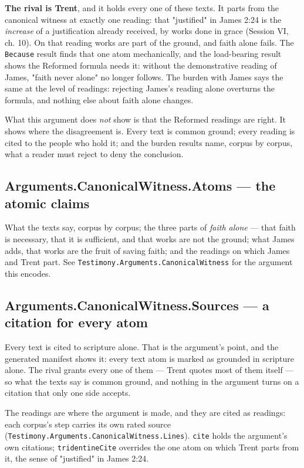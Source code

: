 \documentclass[11pt]{article}
\begin{document}
\textbf{The rival is Trent}, and it holds every one of these texts. It parts from the canonical witness at exactly one reading: that "justified" in James 2:24 is the \emph{increase} of a justification already received, by works done in grace (Session VI, ch. 10). On that reading works are part of the ground, and faith alone fails. The \texttt{Because} result finds that one atom mechanically, and the load-bearing result shows the Reformed formula needs it: without the demonstrative reading of James, "faith never alone" no longer follows. The burden with James says the same at the level of readings: rejecting James's reading alone overturns the formula, and nothing else about faith alone changes.

What this argument does \emph{not} show is that the Reformed readings are right. It shows where the disagreement is. Every text is common ground; every reading is cited to the people who hold it; and the burden results name, corpus by corpus, what a reader must reject to deny the conclusion.

\subsection*{Arguments.CanonicalWitness.Atoms — the atomic claims}
What the texts say, corpus by corpus; the three parts of \emph{faith alone} — that faith is necessary, that it is sufficient, and that works are not the ground; what James adds, that works are the fruit of saving faith; and the readings on which James and Trent part. See \texttt{Testimony.Arguments.Canonical\allowbreak{}Witness} for the argument this encodes.

\subsection*{Arguments.CanonicalWitness.Sources — a citation for every atom}
Every text is cited to scripture alone. That is the argument's point, and the generated manifest shows it: every text atom is marked as grounded in scripture alone. The rival grants every one of them — Trent quotes most of them itself — so what the texts say is common ground, and nothing in the argument turns on a citation that only one side accepts.

The readings are where the argument is made, and they are cited as readings: each corpus's step carries its own rated source (\texttt{Testimony.Arguments.Canonical\allowbreak{}Witness.Lines}). \texttt{cite} holds the argument's own citations; \texttt{tridentine\allowbreak{}Cite} overrides the one atom on which Trent parts from it, the sense of "justified" in James 2:24.
\end{document}
